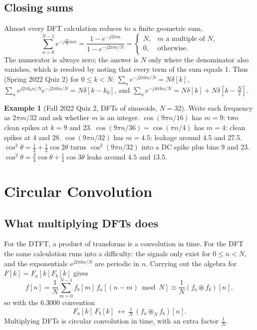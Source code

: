 \documentclass[11pt]{article}
\numberwithin{equation}{section}
\theoremstyle{definition}
\newtheorem{example}{Example}[section]
\theoremstyle{remark}
\newcommand{\cconv}{\circledast}
\begin{document}
\subsection{Closing sums}
Almost every DFT calculation reduces to a finite geometric sum,
\begin{equation}
\sum_{n=0}^{N-1}e^{-j\frac{2\pi}{N}mn}=\frac{1-e^{-j2\pi m}}{1-e^{-j2\pi m/N}}=
\begin{cases}N,& m\text{ a multiple of }N,\\ 0,&\text{otherwise.}\end{cases}
\end{equation}
The numerator is always zero; the answer is $N$ only where the denominator also vanishes, which is
resolved by noting that every term of the sum equals 1. Thus (Spring 2022 Quiz 2) for $0\le k<N$:
$\sum_ne^{-j2\pi kn/N}=N\delta[k]$, $\sum_ne^{j2\pi k_0n/N}e^{-j2\pi kn/N}=N\delta[k-k_0]$, and
$\sum_ne^{-j4\pi kn/N}=N\delta[k]+N\delta[k-\frac N2]$.

\begin{example}[Fall 2022 Quiz 2, DFTs of sinusoids, $N=32$]
Write each frequency as $2\pi m/32$ and ask whether $m$ is an integer.
$\cos(9\pi n/16)$ has $m=9$: two clean spikes at $k=9$ and $23$.
$\cos(9\pi n/36)=\cos(\pi n/4)$ has $m=4$: clean spikes at 4 and 28.
$\cos(9\pi n/32)$ has $m=4.5$: leakage around 4.5 and 27.5.
$\cos^2\theta=\frac12+\frac12\cos2\theta$ turns $\cos^2(9\pi n/32)$ into a DC spike plus bins 9 and 23.
$\cos^3\theta=\frac34\cos\theta+\frac14\cos3\theta$ leaks around $4.5$ and $13.5$.
\end{example}

\section{Circular Convolution}

\subsection{What multiplying DFTs does}
For the DTFT, a product of transforms is a convolution in time. For the DFT the same calculation
runs into a difficulty: the signals only exist for $0\le n<N$, and the exponentials
$e^{j2\pi kn/N}$ are periodic in $n$. Carrying out the algebra for $F[k]=F_a[k]F_b[k]$ gives
\begin{equation}
f[n]=\frac1N\sum_{m=0}^{N-1}f_b[m]\,f_a[(n-m)\bmod N]\equiv\frac1N(f_a\cconv f_b)[n],
\end{equation}
so with the 6.3000 convention
\begin{equation}
\boxed{\;F_a[k]\,F_b[k]\ \longleftrightarrow\ \tfrac1N\,(f_a\cconv_N f_b)[n].\;}
\end{equation}
Multiplying DFTs is circular convolution in time, with an extra factor $\frac1N$.
\end{document}
